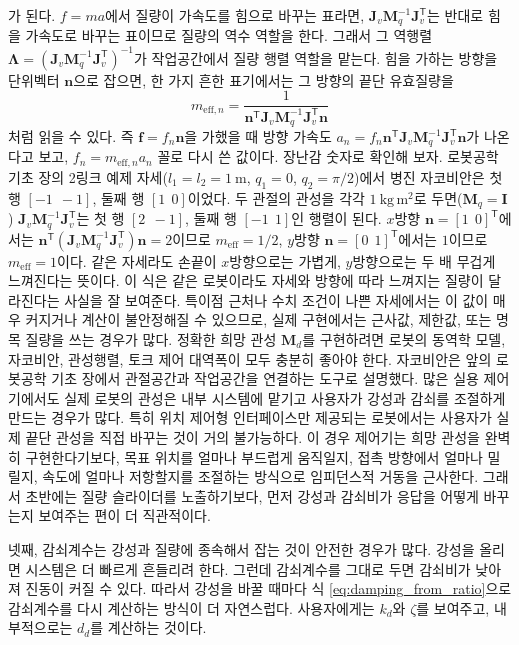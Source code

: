 가 된다.
$f=ma$에서 질량이 가속도를 힘으로 바꾸는 표라면, $\bm{J}_v\bm{M}_q^{-1}\bm{J}_v^{\mathsf{T}}$는 반대로 힘을 가속도로 바꾸는 표이므로 질량의 역수 역할을 한다.
그래서 그 역행렬 $\bm{\Lambda}=(\bm{J}_v\bm{M}_q^{-1}\bm{J}_v^{\mathsf{T}})^{-1}$가 작업공간에서 질량 행렬 역할을 맡는다.
힘을 가하는 방향을 단위벡터 $\bm{n}$으로 잡으면, 한 가지 흔한 표기에서는 그 방향의 끝단 유효질량을
\begin{equation}
  m_{\mathrm{eff},n}
  =
  \frac{1}
  {\bm{n}^{\mathsf{T}}\bm{J}_v\bm{M}_q^{-1}\bm{J}_v^{\mathsf{T}}\bm{n}}
\end{equation}
처럼 읽을 수 있다.
즉 $\bm{f}=f_n\bm{n}$을 가했을 때 방향 가속도 $a_n=f_n\bm{n}^{\mathsf{T}}\bm{J}_v\bm{M}_q^{-1}\bm{J}_v^{\mathsf{T}}\bm{n}$가 나온다고 보고, $f_n=m_{\mathrm{eff},n}a_n$ 꼴로 다시 쓴 값이다.
장난감 숫자로 확인해 보자.
로봇공학 기초 장의 2링크 예제 자세($l_1=l_2=1~\mathrm{m}$, $q_1=0$, $q_2=\pi/2$)에서 병진 자코비안은 첫 행 $[-1\ \ -1]$, 둘째 행 $[1\ \ 0]$이었다.
두 관절의 관성을 각각 $1~\mathrm{kg\,m^2}$로 두면($\bm{M}_q=\bm{I}$) $\bm{J}_v\bm{M}_q^{-1}\bm{J}_v^{\mathsf{T}}$는 첫 행 $[2\ \ -1]$, 둘째 행 $[-1\ \ 1]$인 행렬이 된다.
$x$방향 $\bm{n}=[1\ \ 0]^{\mathsf{T}}$에서는 $\bm{n}^{\mathsf{T}}(\bm{J}_v\bm{M}_q^{-1}\bm{J}_v^{\mathsf{T}})\bm{n}=2$이므로 $m_{\mathrm{eff}}=1/2$, $y$방향 $\bm{n}=[0\ \ 1]^{\mathsf{T}}$에서는 $1$이므로 $m_{\mathrm{eff}}=1$이다.
같은 자세라도 손끝이 $x$방향으로는 가볍게, $y$방향으로는 두 배 무겁게 느껴진다는 뜻이다.
%
이 식은 같은 로봇이라도 자세와 방향에 따라 느껴지는 질량이 달라진다는 사실을 잘 보여준다.
특이점 근처나 수치 조건이 나쁜 자세에서는 이 값이 매우 커지거나 계산이 불안정해질 수 있으므로, 실제 구현에서는 근사값, 제한값, 또는 명목 질량을 쓰는 경우가 많다.
정확한 희망 관성 $\bm{M}_d$를 구현하려면 로봇의 동역학 모델, 자코비안, 관성행렬, 토크 제어 대역폭이 모두 충분히 좋아야 한다.
자코비안은 앞의 로봇공학 기초 장에서 관절공간과 작업공간을 연결하는 도구로 설명했다.
많은 실용 제어기에서도 실제 로봇의 관성은 내부 시스템에 맡기고 사용자가 강성과 감쇠를 조절하게 만드는 경우가 많다.
특히 위치 제어형 인터페이스만 제공되는 로봇에서는 사용자가 실제 끝단 관성을 직접 바꾸는 것이 거의 불가능하다.
이 경우 제어기는 희망 관성을 완벽히 구현한다기보다, 목표 위치를 얼마나 부드럽게 움직일지, 접촉 방향에서 얼마나 밀릴지, 속도에 얼마나 저항할지를 조절하는 방식으로 임피던스적 거동을 근사한다.
그래서 초반에는 질량 슬라이더를 노출하기보다, 먼저 강성과 감쇠비가 응답을 어떻게 바꾸는지 보여주는 편이 더 직관적이다.

넷째, 감쇠계수는 강성과 질량에 종속해서 잡는 것이 안전한 경우가 많다.
강성을 올리면 시스템은 더 빠르게 흔들리려 한다.
그런데 감쇠계수를 그대로 두면 감쇠비가 낮아져 진동이 커질 수 있다.
따라서 강성을 바꿀 때마다 식 \eqref{eq:damping_from_ratio}으로 감쇠계수를 다시 계산하는 방식이 더 자연스럽다.
사용자에게는 $k_d$와 $\zeta$를 보여주고, 내부적으로는 $d_d$를 계산하는 것이다.

